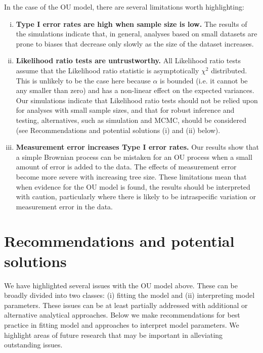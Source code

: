 \documentclass[a4paper,12pt]{article}
\begin{document}
  In the case of the OU model, there are several limitations worth highlighting:
\begin{enumerate}[(i)]
  \item \textbf{Type I error rates are high when sample size is low.} 
  The results of the simulations indicate that, in general, analyses based on small datasets are prone to biases that decrease only slowly as the size of the dataset increases.  
  \item \textbf{Likelihood ratio tests are untrustworthy.}
  All Likelihood ratio tests assume that the Likelihood ratio statistic is asymptotically $\chi^2$ distributed. 
  This is unlikely to be the case here because $\alpha$ is bounded (i.e. it cannot be any smaller than zero) and has a non-linear effect on the expected variances. 
  Our simulations indicate that Likelihood ratio tests should not be relied upon for analyses with small sample sizes, and that for robust inference and testing, alternatives, such as simulation and MCMC, should be considered (see Recommendations and potential solutions (i) and (ii) below).
  \item \textbf{Measurement error increases Type I error rates.} 
  Our results show that a simple Brownian process can be mistaken for an OU process when a small amount of error is added to the data. 
  The effects of measurement error become more severe with increasing tree size.
  These limitations mean that when evidence for the OU model is found, the results should be interpreted with caution, particularly where there is likely to be intraspecific variation or measurement error in the data.
\end{enumerate}

\section{Recommendations and potential solutions}

  We have highlighted several issues with the OU model above. These can be broadly divided into two classes: (i) fitting the model and (ii) interpreting model parameters. These issues can be at least partially addressed with additional or alternative analytical approaches. Below we make recommendations for best practice in fitting model and approaches to interpret model parameters. We highlight areas of future research that may be important in alleviating outstanding issues.
  
\end{document}
